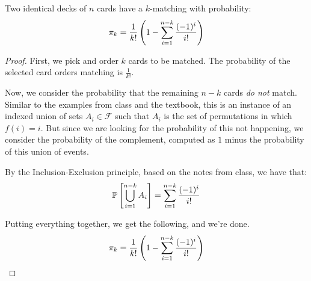 \documentclass[name=Jacob\ Strieb, andrewid=jstrieb, course=69-420, num=4]{homework}
\begin{document}
\begin{claim}
    Two identical decks of $n$ cards have a $k$-matching with probability:
    $$ \pi_k = \frac1{k!} \left(  1 - \sum_{i = 1}^{n - k} \frac{(-1)^i}{i!}  \right) $$
\end{claim}
\begin{proof}
    First, we pick and order $k$ cards to be matched. The probability of the selected card orders matching is $\frac{1}{k!}$.
    
    Now, we consider the probability that the remaining $n - k$ cards \textit{do not} match. Similar to the examples from class and the textbook, this is an instance of an indexed union of sets $A_i \in \mathcal{F}$ such that $A_i$ is the set of permutations in which $f(i) = i$. But since we are looking for the probability of this not happening, we consider the probability of the complement, computed as $1$ minus the probability of this union of events.
    
    By the Inclusion-Exclusion principle, based on the notes from class, we have that:
    $$ \mathbb{P}\left[  \bigcup_{i = 1}^{n - k} A_i  \right] = \sum_{i = 1}^{n - k} \frac{(-1)^i}{i!} $$
    
    Putting everything together, we get the following, and we're done.
    $$ \pi_k = \frac1{k!} \left(  1 - \sum_{i = 1}^{n - k} \frac{(-1)^i}{i!}  \right)$$
\end{proof}
\end{document}
